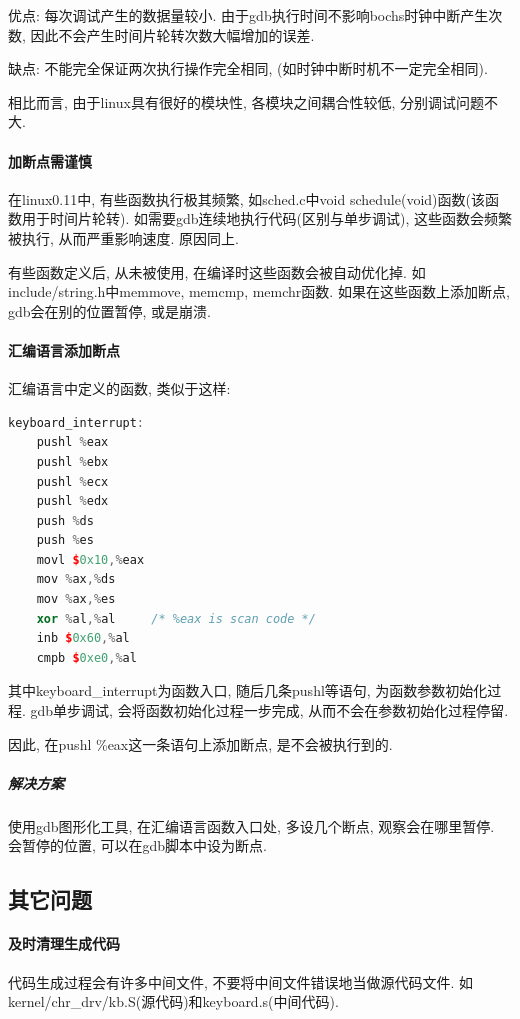 \documentclass[]{report}
\begin{document}
优点: 每次调试产生的数据量较小. 由于gdb执行时间不影响bochs时钟中断产生次数, 因此不会产生时间片轮转次数大幅增加的误差.

缺点: 不能完全保证两次执行操作完全相同, (如时钟中断时机不一定完全相同).

相比而言, 由于linux具有很好的模块性, 各模块之间耦合性较低, 分别调试问题不大.

\paragraph{加断点需谨慎}

在linux0.11中, 有些函数执行极其频繁, 如sched.c中void schedule(void)函数(该函数用于时间片轮转). 如需要gdb连续地执行代码(区别与单步调试), 这些函数会频繁被执行, 从而严重影响速度. 原因同上.

有些函数定义后, 从未被使用, 在编译时这些函数会被自动优化掉. 如include/string.h中memmove, memcmp, memchr函数. 如果在这些函数上添加断点, gdb会在别的位置暂停, 或是崩溃.

\paragraph{汇编语言添加断点}
汇编语言中定义的函数, 类似于这样:
\begin{lstlisting}[language=c++,morekeywords={pushl,push,movl,mov,xor,inb,cmpb}]
keyboard_interrupt:
    pushl %eax
    pushl %ebx
    pushl %ecx
    pushl %edx
    push %ds
    push %es
    movl $0x10,%eax
    mov %ax,%ds
    mov %ax,%es
    xor %al,%al		/* %eax is scan code */
    inb $0x60,%al
    cmpb $0xe0,%al
\end{lstlisting}
其中keyboard\_interrupt为函数入口, 随后几条pushl等语句, 为函数参数初始化过程. gdb单步调试, 会将函数初始化过程一步完成, 从而不会在参数初始化过程停留.

因此, 在pushl \%eax这一条语句上添加断点, 是不会被执行到的.

\subparagraph{解决方案}
使用gdb图形化工具, 在汇编语言函数入口处, 多设几个断点, 观察会在哪里暂停. 会暂停的位置, 可以在gdb脚本中设为断点.

\subsection{其它问题}
\paragraph{及时清理生成代码}
代码生成过程会有许多中间文件, 不要将中间文件错误地当做源代码文件. 如kernel/chr\_drv/kb.S(源代码)和keyboard.s(中间代码).
\end{document}
